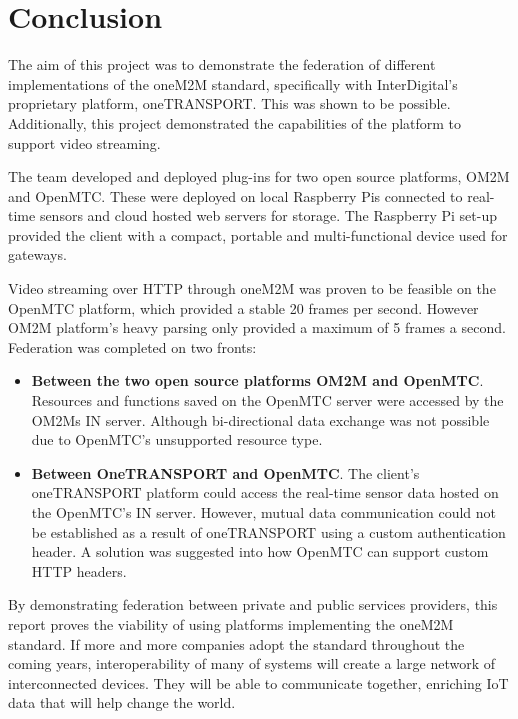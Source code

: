 \chapter{Conclusion}

The aim of this project was to demonstrate the federation of different implementations of the oneM2M standard, specifically with InterDigital's proprietary platform, oneTRANSPORT. This was shown to be possible. Additionally, this project demonstrated the capabilities of the platform to support video streaming.

The team developed and deployed plug-ins for two open source platforms, OM2M and OpenMTC. These were deployed on local Raspberry Pis connected to real-time sensors and cloud hosted web servers for storage. The Raspberry Pi set-up provided the client with a compact, portable and multi-functional device used for gateways.

Video streaming over HTTP through oneM2M was proven to be feasible on the OpenMTC platform, which provided a stable 20 frames per second. However OM2M platform's heavy parsing only provided a maximum of 5 frames a second. Federation was completed on two fronts:

\begin{itemize}
\item \textbf{Between the two open source platforms OM2M and OpenMTC}. Resources and functions saved on the OpenMTC server were accessed by the OM2Ms IN server. Although bi-directional data exchange was not possible due to OpenMTC's unsupported resource type. 
\item \textbf{Between OneTRANSPORT and OpenMTC}. The client's oneTRANSPORT platform could access the real-time sensor data hosted on the OpenMTC's IN server. However, mutual data communication could not be established as a result of oneTRANSPORT using a custom authentication header. A solution was suggested into how OpenMTC can support custom HTTP headers. 
\end{itemize}

By demonstrating federation between private and public services providers, this report proves the viability of using platforms implementing the oneM2M standard. If more and more companies adopt the standard throughout the coming years, interoperability of many of systems will create a large network of interconnected devices. They will be able to communicate together, enriching IoT data that will help change the world.

\clearpage
